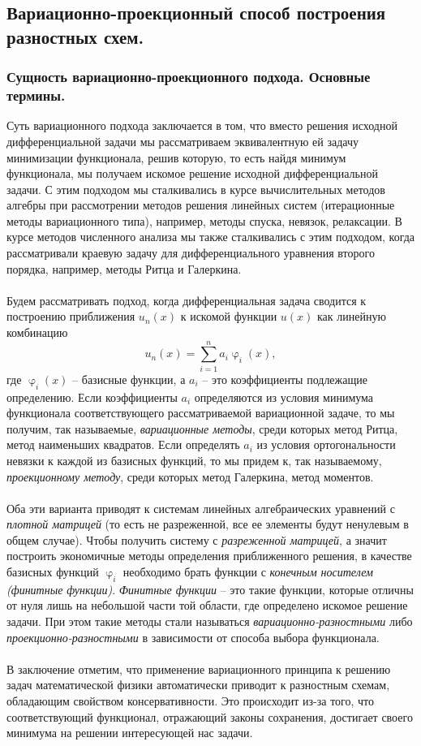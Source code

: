 \documentclass[a4paper, 12pt]{report}
\numberwithin{equation}{section}
\renewcommand{\varphi}{\upvarphi}
\begin{document}
		\subsection{Вариационно-проекционный способ построения разностных схем.}
		\subsubsection{Сущность вариационно-проекционного подхода. Основные термины.}
		Суть вариационного подхода заключается в том, что вместо решения исходной дифференциальной задачи мы рассматриваем эквивалентную ей задачу минимизации функционала, решив которую, то есть найдя минимум функционала, мы получаем искомое решение исходной дифференциальной задачи. С этим подходом мы сталкивались в курсе вычислительных методов алгебры при рассмотрении методов решения линейных систем (итерационные методы вариационного типа), например, методы спуска, невязок, релаксации. В курсе методов численного анализа мы также сталкивались с этим подходом, когда рассматривали краевую задачу для дифференциального уравнения второго порядка, например, методы Ритца и Галеркина.
		\\\\
		Будем рассматривать подход, когда дифференциальная задача сводится к построению приближения $u_n(x)$ к искомой функции $u(x)$ как линейную комбинацию
		$$u_n(x) = \sum_{i=1}^n a_i \varphi_i(x),$$
		где $\varphi_i(x)$ -- базисные функции, а $a_i$ -- это коэффициенты подлежащие определению. Если коэффициенты $a_i$ определяются из условия минимума функционала соответствующего рассматриваемой вариационной задаче, то мы получим, так называемые, \textit{вариационные методы}, среди которых метод Ритца, метод наименьших квадратов. Если определять $a_i$ из условия ортогональности невязки к каждой из базисных функций, то мы придем к, так называемому, \textit{проекционному методу}, среди которых метод Галеркина, метод моментов.\\\\
		Оба эти варианта приводят к системам линейных алгебраических уравнений с \textit{плотной матрицей} (то есть не разреженной, все ее элементы будут ненулевым в общем случае). Чтобы получить систему с \textit{разреженной матрицей}, а значит построить экономичные методы определения приближенного решения, в качестве базисных функций $\varphi_i$ необходимо брать функции с \textit{конечным носителем (финитные функции)}. \textit{Финитные функции} -- это такие функции, которые отличны от нуля лишь на небольшой части той области, где определено искомое решение задачи. При этом такие методы стали называться \textit{вариационно-разностными} либо \textit{проекционно-разностными} в зависимости от способа выбора функционала.
		\\\\
		В заключение отметим, что применение вариационного принципа к решению задач математической физики автоматически приводит к разностным схемам, обладающим свойством консервативности. Это происходит из-за того, что соответствующий функционал, отражающий законы сохранения, достигает своего минимума на решении интересующей нас задачи.
\end{document}
